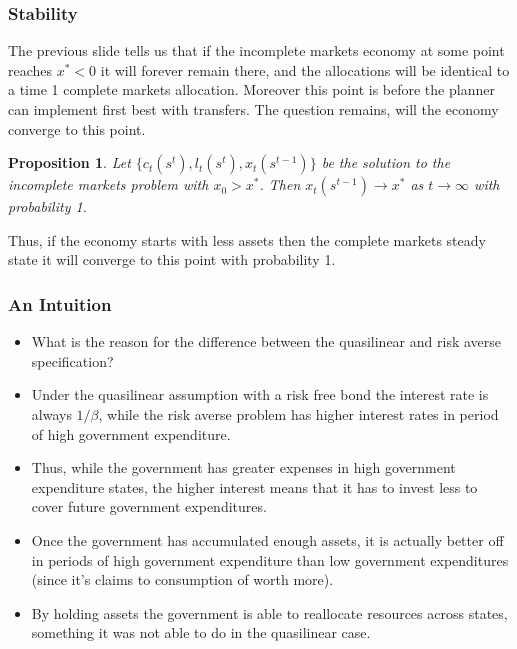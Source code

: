\documentclass{beamer}
\newtheorem{proposition}{Proposition}
\begin{document}
\begin{frame}
	\frametitle{Stability}
	The previous slide tells us that if the incomplete markets economy at some point reaches  $x^* < 0$ it will forever remain there, and the allocations will be identical to a time 1 complete markets allocation.  Moreover this point is before the planner can implement first best with transfers.  The question remains, will the economy converge to this point.
	\begin{proposition}  Let $\{c_t(s^t), l_t(s^t), x_t(s^{t-1})\}$ be the solution to the incomplete markets problem with $x_0 > x^*$.  Then  $x_t(s^{t-1})\rightarrow x^*$ as $t\rightarrow \infty$ with probability 1.
	\end{proposition}  Thus, if the economy starts with less assets then the complete markets steady state it will converge to this point with probability 1.
\end{frame}

\begin{frame}
	\frametitle{An Intuition}
	\begin{itemize}
		\item  What is the reason for the difference between the quasilinear and risk averse specification?
		\item  Under the quasilinear assumption with a risk free bond the interest rate is always $1/\beta$, while the risk averse problem has higher interest rates in period of high government expenditure.
		\item  Thus, while the government has greater expenses in high government expenditure states, the higher interest means that it has to invest less to cover future government expenditures.
		\item  Once the government has accumulated enough assets, it is actually better off in periods of high government expenditure than low government expenditures (since it's claims to consumption of worth more).
		\item  By holding assets the government is able to reallocate resources across states, something it was not able to do in the quasilinear case.
	\end{itemize}
\end{frame}
\end{document}
